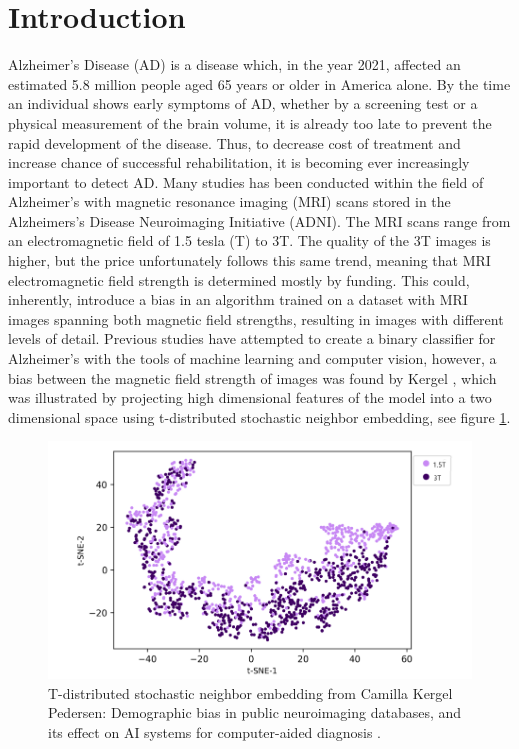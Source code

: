 \documentclass[11pt, fleqn, titlepage]{article}
\newcommand{\1}[1]{\mathds{1}\left[#1\right]}
\begin{document}
{
\hypersetup{linkcolor=black}
\newpage
\tableofcontents 
\newpage
}

\section{Introduction} \label{indledning}
Alzheimer’s Disease (AD) is a disease which, in the year 2021, affected an
estimated 5.8 million people aged 65 years or older in America alone. By the
time an individual shows early symptoms of AD, whether by a screening test
or a physical measurement of the brain volume, it is already too late to prevent the rapid development of the disease. Thus, to decrease cost of treatment
and increase chance of successful rehabilitation, it is becoming ever increasingly
important to detect AD. Many studies has been conducted within the field of Alzheimer's with magnetic resonance imaging (MRI) scans stored
in the Alzheimers’s Disease Neuroimaging Initiative (ADNI). The MRI scans
range from an electromagnetic field of 1.5 tesla (T) to 3T. The quality of the 3T
images is higher, but the price unfortunately follows this same trend, meaning that MRI electromagnetic field strength is determined mostly by funding. This could, inherently, introduce a bias in an algorithm trained on a dataset with MRI images
spanning both magnetic field strengths, resulting in images with different levels
of detail. Previous studies have attempted to create a binary classifier for Alzheimer's with the tools of machine learning and computer vision, however, a bias between the magnetic field strength of images was found by Kergel \cite{CamillaKandidat}, which was illustrated by projecting high dimensional features of the model into a two dimensional space using t-distributed stochastic neighbor embedding, see figure \ref{fig:camillatsne}.

\begin{figure}[H]
	\centering
	\includegraphics[width=0.6\linewidth]{imgs/camilla_tsne}
	\caption{T-distributed stochastic neighbor embedding from Camilla Kergel Pedersen: Demographic bias in public neuroimaging databases, and its
		effect on AI systems for computer-aided diagnosis \cite{CamillaKandidat}.}
	\label{fig:camillatsne}
\end{figure}
\end{document}
